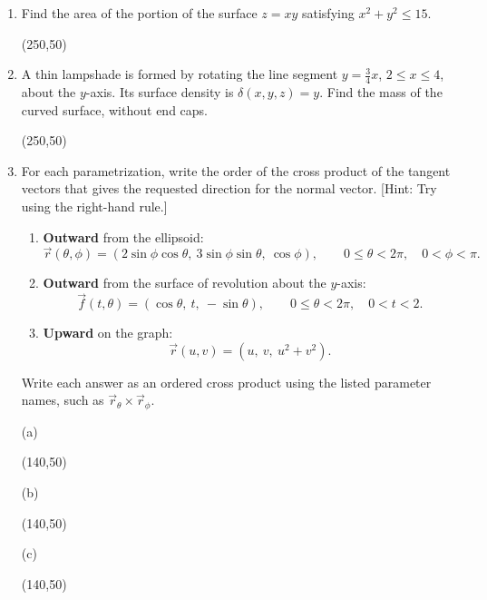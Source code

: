 \documentclass[12pt]{exam}
\begin{document}
\begin{enumerate}

\item Find the area of the portion of the surface $z=xy$ satisfying
$x^2+y^2\leq15$.

\vfill
\begin{flushright}
\framebox(250,50){}
\end{flushright}

\item A thin lampshade is formed by rotating the line segment
$y=\frac34x$, $2\leq x\leq4$, about the $y$-axis. Its surface density is
$\delta(x,y,z)=y$. Find the mass of the curved surface, without end caps.

\vfill
\begin{flushright}
\framebox(250,50){}
\end{flushright}

\newpage

\item For each parametrization, write the order of the cross product of the tangent vectors that gives the requested direction for the normal vector. [Hint: Try using the right-hand rule.]

\begin{enumerate}[label=(\alph*),itemsep=4pt]
\item \textbf{Outward} from the ellipsoid:
\[
\vec r(\theta,\phi)
=(2\sin\phi\cos\theta,\ 3\sin\phi\sin\theta,\ \cos\phi),
\qquad0\leq\theta<2\pi,\quad0<\phi<\pi.
\]
\item \textbf{Outward} from the surface of revolution about the $y$-axis:
\[
\vec f(t,\theta)=(\cos\theta,\ t,\ -\sin\theta),
\qquad0\leq\theta<2\pi,\quad0<t<2.
\]
\item \textbf{Upward} on the graph:
\[
\vec r(u,v)=(u,\ v,\ u^2+v^2).
\]
\end{enumerate}

Write each answer as an ordered cross product using the listed parameter
names, such as $\vec r_\theta\times\vec r_\phi$.

\vfill
\begin{flushright}
\begin{minipage}{0.29\linewidth}
\centering
(a)\par\smallskip
\framebox(140,50){}
\end{minipage}\hspace{0.3cm}
\begin{minipage}{0.29\linewidth}
\centering
(b)\par\smallskip
\framebox(140,50){}
\end{minipage}\hspace{0.3cm}
\begin{minipage}{0.29\linewidth}
\centering
(c)\par\smallskip
\framebox(140,50){}
\end{minipage}
\end{flushright}


\end{enumerate}
\end{document}

